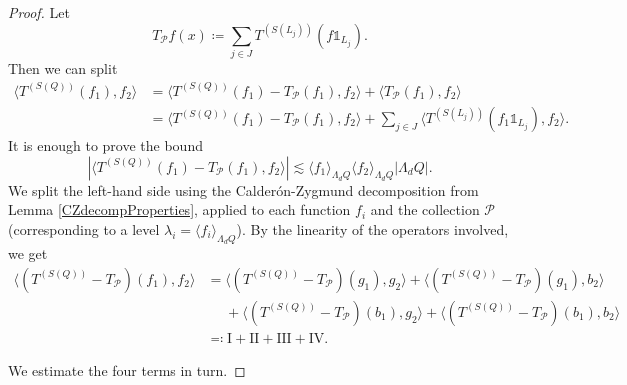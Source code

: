\documentclass[12pt]{amsart}
\newcommand{\one}{\mathds{1}}
\theoremstyle{plain}
\theoremstyle{definition} %
\numberwithin{equation}{section}
\begin{document}
\begin{proof}
    Let 
    \[
    T_{\mathcal{P}}f(x)
    \coloneqq 
    \sum_{j\in J} T^{(S(L_j))}(f\one_{L_j}).
    \]
    Then we can split
    \begin{align*}
        \langle T^{(S(Q))}(f_1),f_2\rangle 
        &=
        \langle T^{(S(Q))}(f_1)-T_{\mathcal{P}}(f_1),f_2\rangle 
        +
        \langle T_{\mathcal{P}}(f_1),f_2\rangle 
        \\&=
        \langle T^{(S(Q))}(f_1)-T_{\mathcal{P}}(f_1),f_2\rangle 
        +
        \sum_{j\in J}\langle T^{(S(L_j))}(f_1\one_{L_j}),f_2\rangle.
    \end{align*}
    It is enough to prove the bound
    \[
    |\langle T^{(S(Q))}(f_1)-T_{\mathcal{P}}(f_1),f_2\rangle|
    \lesssim 
    \langle f_1\rangle_{\Lambda_dQ}\langle f_2\rangle_{\Lambda_dQ}|\Lambda_dQ|.
    \]
    We split the left-hand side using the Calder\'on-Zygmund decomposition from Lemma \ref{CZdecompProperties}, applied to each function $f_i$ and the collection $\mathcal{P}$ (corresponding to a level $\lambda_i= \langle f_i\rangle_{\Lambda_dQ}$). By the linearity of the operators involved, we get
    \begin{align*}
        \langle (T^{(S(Q))}-T_{\mathcal{P}})(f_1),f_2\rangle
        &=
        \langle (T^{(S(Q))}-T_{\mathcal{P}})(g_1),g_2\rangle
        +
        \langle (T^{(S(Q))}-T_{\mathcal{P}})(g_1),b_2\rangle
        \\&\phantom{=}+
        \langle (T^{(S(Q))}-T_{\mathcal{P}})(b_1),g_2\rangle
        +
        \langle (T^{(S(Q))}-T_{\mathcal{P}})(b_1),b_2\rangle
        \\&\eqqcolon 
        \mathrm{I}+\mathrm{II}+\mathrm{III}+\mathrm{IV}.
    \end{align*}

We estimate the four terms in turn.


\end{proof}
\end{document}
